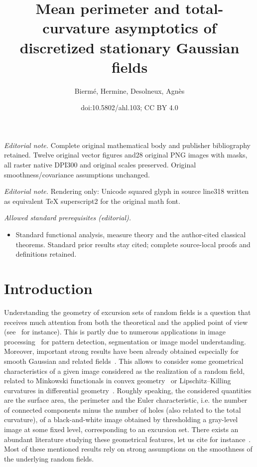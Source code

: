 \documentclass[10pt]{amsart}
\title{Mean perimeter and total-curvature asymptotics of discretized stationary Gaussian fields}
\author{Biermé, Hermine, Desolneux, Agnès}
\date{doi:10.5802/ahl.103; CC BY 4.0}
\theoremstyle{definition}\newtheorem{defi}[theo]{Definition}\newtheorem{rema}[theo]{Remark}\newtheorem{exam}[theo]{Example}\newtheorem{exem}[theo]{Example}\newtheorem{nota}[theo]{Notation}
\begin{document}
\maketitle
\noindent\textit{Editorial note.} Complete original mathematical body and publisher bibliography retained. Twelve original vector figures and28 original PNG images with masks, all raster native DPI300 and original scales preserved. Original smoothness/covariance assumptions unchanged.\par\medskip
\noindent\textit{Editorial note.} Rendering only: Unicode squared glyph in source line318 written as equivalent TeX superscript2 for the original math font.\par\medskip
\noindent\textit{Allowed standard prerequisites (editorial).}\begin{itemize}
\item Standard functional analysis, measure theory and the author-cited classical theorems. Standard prior results stay cited; complete source-local proofs and definitions retained.
\end{itemize}\medskip

\section{Introduction}

Understanding the geometry of excursion sets of random fields is a question that receives much attention from both the theoretical and the applied point of view (see~\cite{AdlerReview00} for instance). This is partly due to numerous applications in image processing~\cite{SerraBook,Worsley96} for pattern detection, segmentation or image model understanding. Moreover, important strong results have been already obtained especially for smooth Gaussian and related fields~\cite{AdlerTaylorBook}. This allows to consider some geometrical characteristics of a given image considered as the realization of a random field, related to Minkowski functionals in convex geometry~\cite{Stoyan87} or Lipschitz--Killing curvatures in differential geometry~\cite{Thale08}. Roughly speaking, the considered quantities are the surface area, the perimeter and the Euler characteristic, i.e. the number of connected components minus the number of holes (also related to the total curvature), of a black-and-white image obtained by thresholding a gray-level image at some fixed level, corresponding to an excursion set. There exists an abundant literature studying these geometrical features, let us cite for instance~\cite{Azais,DEL17,EstradeLeon, KV17,LachiezeRey2018II}. Most of these mentioned results rely on strong assumptions on the smoothness of the underlying random fields.
\end{document}
